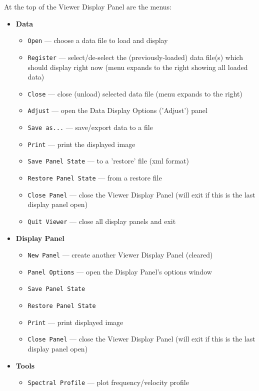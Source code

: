 At the top of the Viewer Display Panel are the menus:
\begin{itemize}
\item {\bf Data}
  \begin{itemize}
      \item  {\tt Open} --- choose a data file to load and display
      \item  {\tt Register} --- select/de-select the (previously-loaded)
             data file(s) which should display right now (menu expands
	     to the right showing all loaded data) 
      \item  {\tt Close} --- close (unload) selected data file (menu
             expands to the right)
      \item  {\tt Adjust} --- open the Data Display Options ('Adjust') panel 
      \item  {\tt Save as...} --- save/export data to a file
      \item  {\tt Print} --- print the displayed image
      \item  {\tt Save Panel State} --- to a 'restore' file (xml format)
      \item  {\tt Restore Panel State} --- from a restore file
      \item  {\tt Close Panel} --- close the Viewer Display Panel (will exit
             if this is the last display panel open)
      \item  {\tt Quit Viewer} --- close all display panels and exit
  \end{itemize}
\item {\bf Display Panel}
  \begin{itemize}
      \item {\tt New Panel} --- create another Viewer Display Panel (cleared)
      \item {\tt Panel Options} --- open the Display Panel's options window
      \item  {\tt Save Panel State}
      \item  {\tt Restore Panel State}
      \item {\tt Print} --- print displayed image
      \item {\tt Close Panel} --- close the Viewer Display Panel (will exit if
            this is the last display panel open)
  \end{itemize}
\item {\bf Tools}
  \begin{itemize}
      \item {\tt Spectral Profile} --- plot frequency/velocity profile

\end{itemize}
\end{itemize}
